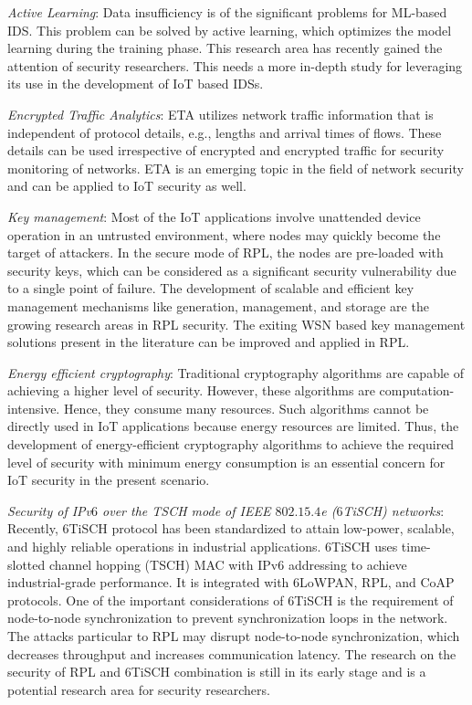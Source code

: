 \documentclass[10pt,journal,sort & compress]{IEEEtran}
\begin{document}
\textit{Active Learning}: Data insufficiency is of the significant problems for ML-based IDS. This problem can be solved by active learning, which optimizes the model learning during the training phase. This research area has recently gained the attention of security researchers. This needs a more in-depth study for leveraging its use in the development of IoT based IDSs.

\textit{Encrypted Traffic Analytics}:  ETA utilizes network traffic information that is independent of protocol details, e.g., lengths and arrival times of flows. These details can be used irrespective of encrypted and encrypted traffic for security monitoring of networks. ETA is an emerging topic in the field of network security and can be applied to IoT security as well.

\textit{Key management}: Most of the IoT applications involve unattended device operation in an untrusted environment, where nodes may quickly become the target of attackers. In the secure mode of RPL, the nodes are pre-loaded with security keys, which can be considered as a significant security vulnerability due to a single point of failure. The development of scalable and efficient key management mechanisms like generation, management, and storage are the growing research areas in RPL security. The exiting WSN based key management solutions present in the literature can be improved and applied in RPL.

\textit{Energy efficient cryptography}: Traditional cryptography algorithms are capable of achieving a higher level of security. However, these algorithms are computation-intensive. Hence, they consume many resources.  Such algorithms cannot be directly used in IoT applications because energy resources are limited. Thus, the development of energy-efficient cryptography algorithms to achieve the required level of security with minimum energy consumption is an essential concern for IoT security in the present scenario.

\textit{Security of IPv$ 6 $ over the TSCH mode of IEEE $ 802.15.4 $e ($ 6 $TiSCH) networks}: Recently, $ 6 $TiSCH protocol \cite{vilajosana2019ietf} has been standardized to attain low-power, scalable, and highly reliable operations in industrial applications. $ 6 $TiSCH uses time-slotted channel hopping (TSCH) MAC with IPv$ 6 $ addressing to achieve industrial-grade performance. It is integrated with $ 6 $LoWPAN, RPL, and CoAP protocols. One of the important considerations of $ 6 $TiSCH is the requirement of node-to-node synchronization to prevent synchronization loops in the network. The attacks particular to RPL may disrupt node-to-node synchronization, which decreases throughput and increases communication latency. The research on the security of RPL and $ 6 $TiSCH combination is still in its early stage and is a potential research area for security researchers.
\end{document}
